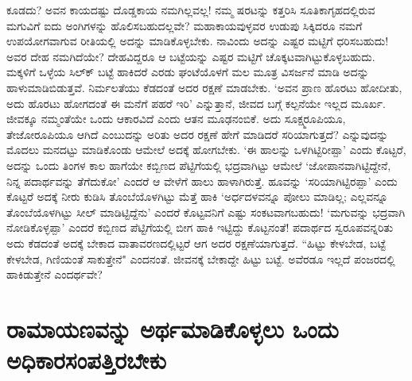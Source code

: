 ಕೂಡದು? ಅವನ ಕಾಯದಷ್ಟು ದೊಡ್ಡಕಾಯ ನಮಗಿಲ್ಲವಲ್ಲ! ನಮ್ಮ ಷರಟನ್ನು ಕತ್ತರಿಸಿ ಸೂತಿಕಾಗೃಹದಲ್ಲಿರುವ ಮಗುವಿಗೆ ಐದು ಅಂಗಿಗಳನ್ನು ಹೊಲಿಸಬಹುದಲ್ಲವೇ? ಮಹಾಕಾಯವುಳ್ಳವರ ಉಡುಪು ಸಿಕ್ಕಿದರೂ ನಮಗೆ ಉಪಯೋಗವಾಗುವ ರೀತಿಯಲ್ಲಿ ಅದನ್ನು ಮಾಡಿಕೊಳ್ಳಬೇಕು. ನಾವಿಂದು ಅದನ್ನು ಎಷ್ಟರ ಮಟ್ಟಿಗೆ ಧರಿಸಬಹುದು! ಅವರ ದೇಹ ನಮಗಿದೆಯೇ? ದೇಹವಿದ್ದರೂ ಆ ಬಟ್ಟೆಯನ್ನು ಎಷ್ಟರ ಮಟ್ಟಿಗೆ ಚೊಕ್ಕಟವಾಗಿಟ್ಟುಕೊಳ್ಳಬಹುದು. ಮಕ್ಕಳಿಗೆ ಒಳ್ಳೆಯ ಸಿಲ್ಕ್‍ ಬಟ್ಟೆ ಹಾಕಿದರೆ ಎರಡು ಘಂಟೆಯೊಳಗೆ ಮಲ ಮೂತ್ರ ವಿಸರ್ಜನೆ ಮಾಡಿ ಅದನ್ನು ಹಾಳುಮಾಡಿಬಿಡುತ್ತವೆ. ನಿರ್ಮಲತೆಯು ಕೆಡದಂತೆ ಅದರ ರಕ್ಷಣೆ ಮಾಡಬೇಕು. `ಅವನ ಪ್ರಾಣ ಹೊರಟು ಹೋದೀತು, ಅದು ಹೊರಟು ಹೋಗದಂತೆ ಈ ಮನೆಗೆ ಪಹರೆ ಇರಿ' ಎನ್ನುತ್ತಾನೆ, ಜೀವದ ಬಗ್ಗೆ ಕಲ್ಪನೆಯೇ ಇಲ್ಲದ ಮೂರ್ಖ. ಜೀವಕ್ಕೂ ನಮ್ಮಂತೆಯೇ ಒಂದು ಆಕಾರವಿದೆ ಎಂದು ಆತನ ಮೂಢನಂಬಿಕೆ. ಅದು ಸೂಕ್ಷ್ಮರೂಪಿಯೂ, ತೇಜೋರೂಪಿಯೂ ಆಗಿದೆ ಎಂಬುದನ್ನು ಅರಿತು ಅದರ ರಕ್ಷಣೆ ಹೇಗೆ ಮಾಡಿದರೆ ಸರಿಯಾಗುತ್ತದೆ? ಎನ್ನುವುದನ್ನು ಮೊದಲು ಮನದಟ್ಟು ಮಾಡಿಕೊಂಡು ಆಮೇಲೆ ಅದಕ್ಕೆ ಹೋಗಬೇಕು. `ಈ ಹಾಲನ್ನು ಒಳಗಿಟ್ಟಿರೀಪ್ಪಾ' ಎಂದು ಕೊಟ್ಟರೆ, ಅದನ್ನು ಒಂದು ತಿಂಗಳ ಕಾಲ ಹಾಗೆಯೇ ಕಬ್ಬಿಣದ ಪೆಟ್ಟಿಗೆಯಲ್ಲಿ ಭದ್ರವಾಗಿಟ್ಟು ಆಮೇಲೆ `ಜೋಪಾನವಾಗಿಟ್ಟಿದ್ದೇನೆ, ನಿನ್ನ ಪದಾರ್ಥವನ್ನು ತೆಗೆದುಕೋ' ಎಂದರೆ ಆ ವೇಳೆಗೆ ಹಾಲು ಹಾಳಾಗಿರುತ್ತೆ. ಹೂವನ್ನು `ಸರಿಯಾಗಿಟ್ಟಿರಪ್ಪಾ' ಎಂದು ಕೊಟ್ಟರೆ ಅದಕ್ಕೆ ನೀರು ಕುಡಿಸಿ ತೊಂಬೆಯೊಳಗಿಟ್ಟು ಮೆತ್ತೆ ಹಾಕಿ `ಅರ್ಧದಳವನ್ನೂ ಪೋಲು ಮಾಡಿಲ್ಲ; ಎಲ್ಲವನ್ನೂ ತೊಂಬೆಯೊಳಗಿಟ್ಟು ಸೀಲ್‍ ಮಾಡಿಟ್ಟಿದ್ದೆನು' ಎಂದರೆ ಕೊಟ್ಟವನಿಗೆ ಎಷ್ಟು ಸಂಕಟವಾಗಬಹುದು! `ಮಗುವನ್ನು ಭದ್ರವಾಗಿ ನೋಡಿಕೊಳ್ಳಪ್ಪಾ' ಎಂದರೆ ಕಬ್ಬಿಣದ ಪೆಟ್ಟಿಗೆಯಲ್ಲಿ ಬೀಗ ಹಾಕಿ ಇಟ್ಟಿದ್ದು ಕೊಟ್ಟನಂತೆ! ಪದಾರ್ಥದ ಸ್ವರೂಪವನ್ನರಿತು ಅದು ಕೆಡದಂತೆ ಅದಕ್ಕೆ ಬೇಕಾದ ವಾತಾವರಣದಲ್ಲಿಟ್ಟರೆ ಆಗ ಅದರ ರಕ್ಷಣೆಯಾಗುತ್ತದೆ. ``ಹಿಟ್ಟು ಕೇಳಬೇಡ, ಬಟ್ಟೆ ಕೇಳಬೇಡ, ಗಿಣಿಯಂತೆ ಸಾಕುತ್ತೇನೆ" ಎಂದನಂತೆ. ಜೀವನಕ್ಕೆ ಬೇಕಾದ್ದೇ ಹಿಟ್ಟು ಬಟ್ಟೆ. ಅವೆರಡೂ ಇಲ್ಲದೆ ಪಂಜರದಲ್ಲಿ ಹಾಕಿಡುತ್ತೇನೆ ಎಂದರ್ಥವೇ? 


\section*{ರಾಮಾಯಣವನ್ನು ಅರ್ಥಮಾಡಿಕೊಳ್ಳಲು ಒಂದು ಅಧಿಕಾರಸಂಪತ್ತಿರಬೇಕು} 

